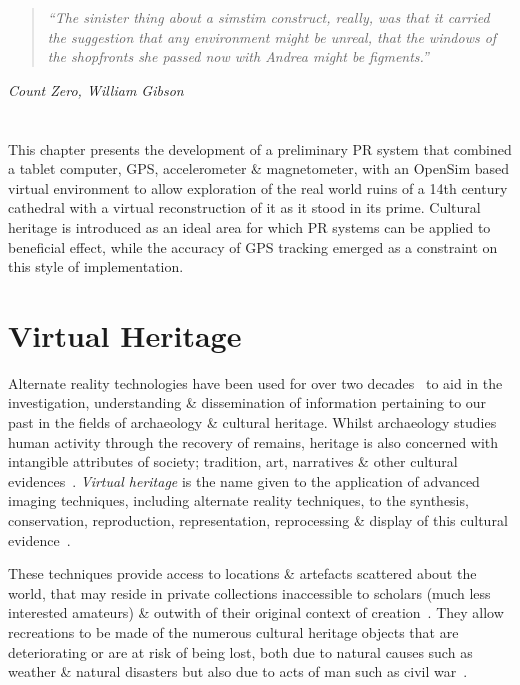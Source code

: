 \begin{quote}
	\textit{``The sinister thing about a simstim construct, really, was that it carried the suggestion that any environment might be unreal, that the windows of the shopfronts she passed now with Andrea might be figments.''}
\end{quote}
\hfill \textit{Count Zero, William Gibson}
\\
\\
\\


This chapter presents the development of a preliminary PR system that combined a tablet computer, GPS, accelerometer \& magnetometer, with an OpenSim based virtual environment to allow exploration of the real world ruins of a 14th century cathedral with a virtual reconstruction of it as it stood in its prime. Cultural heritage is introduced as an ideal area for which PR systems can be applied to beneficial effect, while the accuracy of GPS tracking emerged as a constraint on this style of implementation.


\section{Virtual Heritage}

Alternate reality technologies have been used for over two decades~\cite{Roussou2002} to aid in the investigation, understanding \& dissemination of information pertaining to our past in the fields of archaeology \& cultural heritage. Whilst archaeology studies human activity through the recovery of remains, heritage is also concerned with intangible attributes of society; tradition, art, narratives \& other cultural evidences~\cite{Roussou2002}. \textit{Virtual heritage} is the name given to the application of advanced imaging techniques, including alternate reality techniques, to the synthesis, conservation, reproduction, representation, reprocessing \& display of this cultural evidence~\cite{roussou:photorealism}.

These techniques provide access to locations \& artefacts scattered about the world, that may reside in private collections inaccessible to scholars (much less interested amateurs) \& outwith of their original context of creation~\cite{griffin:recovering}. They allow recreations to be made of the numerous cultural heritage objects that are deteriorating or are at risk of being lost, both due to natural causes such as weather \& natural disasters but also due to acts of man such as civil war~\cite{Ikeuchi2003}.


